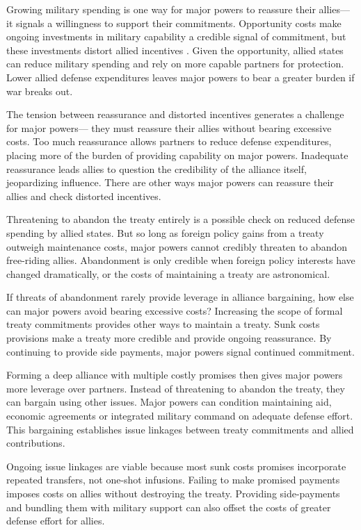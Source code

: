 \documentclass[12pt]{article}
\begin{document}
Growing military spending is one way for major powers to reassure their allies--- it signals a willingness to support their commitments. 
Opportunity costs make ongoing investments in military capability a credible signal of commitment, but these investments distort allied incentives \citep{Lake1996, Lake2009}. 
Given the opportunity, allied states can reduce military spending and rely on more capable partners for protection.
Lower allied defense expenditures leaves major powers to bear a greater burden if war breaks out. 


The tension between reassurance and distorted incentives generates a challenge for major powers--- they must reassure their allies without bearing excessive costs.
Too much reassurance allows partners to reduce defense expenditures, placing more of the burden of providing capability on major powers. 
Inadequate reassurance leads allies to question the credibility of the alliance itself, jeopardizing influence.   
There are other ways major powers can reassure their allies and check distorted incentives. 


Threatening to abandon the treaty entirely is a possible check on reduced defense spending by allied states. 
But so long as foreign policy gains from a treaty outweigh maintenance costs, major powers cannot credibly threaten to abandon free-riding allies. 
Abandonment is only credible when foreign policy interests have changed dramatically, or the costs of maintaining a treaty are astronomical. 


If threats of abandonment rarely provide leverage in alliance bargaining, how else can major powers avoid bearing excessive costs? 
Increasing the scope of formal treaty commitments provides other ways to maintain a treaty.
Sunk costs provisions make a treaty more credible and provide ongoing reassurance.
By continuing to provide side payments, major powers signal continued commitment. 

 
Forming a deep alliance with multiple costly promises then gives major powers more leverage over partners. 
Instead of threatening to abandon the treaty, they can bargain using other issues. 
Major powers can condition maintaining aid, economic agreements or integrated military command on adequate defense effort.
This bargaining establishes issue linkages between treaty commitments and allied contributions. 


Ongoing issue linkages are viable because most sunk costs promises incorporate repeated transfers, not one-shot infusions. 
Failing to make promised payments imposes costs on allies without destroying the treaty. 
Providing side-payments and bundling them with military support can also offset the costs of greater defense effort for allies. 
\end{document}
